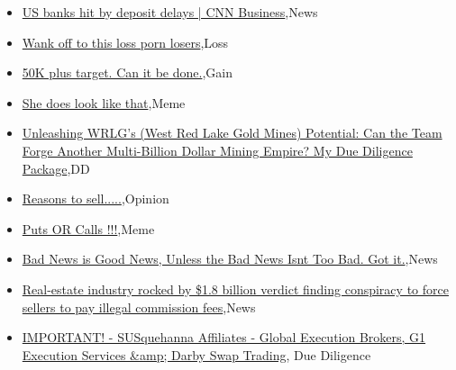 \documentclass{article}%
\begin{document}
%
\begin{itemize}%
\item%
\href{https://reddit.com/r/wallstreetbets/comments/17ne7m3/us\_banks\_hit\_by\_deposit\_delays\_cnn\_business/}{US banks hit by deposit delays | CNN Business},News%
\item%
\href{https://reddit.com/r/wallstreetbets/comments/17nclc6/wank\_off\_to\_this\_loss\_porn\_losers/}{Wank off to this loss porn losers},Loss%
\item%
\href{https://reddit.com/r/wallstreetbets/comments/17ncg3u/50k\_plus\_target\_can\_it\_be\_done/}{50K plus target. Can it be done.},Gain%
\item%
\href{https://reddit.com/r/wallstreetbets/comments/17nbe3w/she\_does\_look\_like\_that/}{She does look like that},Meme%
\item%
\href{https://reddit.com/r/Baystreetbets/comments/17mw59a/unleashing\_wrlgs\_west\_red\_lake\_gold\_mines/}{Unleashing WRLG's (West Red Lake Gold Mines) Potential: Can the Team Forge Another Multi-Billion Dollar Mining Empire? My Due Diligence Package},DD%
\item%
\href{https://reddit.com/r/StockMarket/comments/17ngh8d/reasons\_to\_sell/}{Reasons to sell.....},Opinion%
\item%
\href{https://reddit.com/r/StockMarket/comments/17nc4ll/puts\_or\_calls/}{Puts OR Calls !!!},Meme%
\item%
\href{https://reddit.com/r/StockMarket/comments/17n213k/bad\_news\_is\_good\_news\_unless\_the\_bad\_news\_isnt/}{Bad News is Good News, Unless the Bad News Isnt Too Bad. Got it.},News%
\item%
\href{https://reddit.com/r/Economics/comments/17n3mqc/realestate\_industry\_rocked\_by\_18\_billion\_verdict/}{Real-estate industry rocked by \$1.8 billion verdict finding conspiracy to force sellers to pay illegal commission fees},News%
\item%
\href{https://reddit.com/r/Superstonk/comments/17nkgnw/important\_susquehanna\_affiliates\_global\_execution/}{IMPORTANT! - SUSquehanna Affiliates - Global Execution Brokers, G1 Execution Services \&amp; Darby Swap Trading}, Due Diligence%
\end{itemize}%
\end{document}

